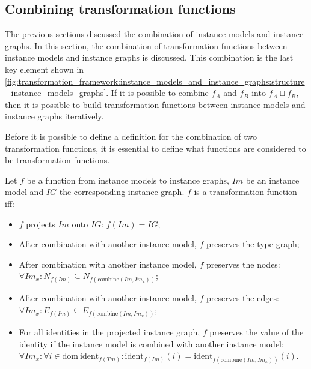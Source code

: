 \subsection{Combining transformation functions}
\label{subsec:transformation_framework:instance_models_and_instance_graphs:combining_transformation_functions}

The previous sections discussed the combination of instance models and instance graphs. In this section, the combination of transformation functions between instance models and instance graphs is discussed. This combination is the last key element shown in \cref{fig:transformation_framework:instance_models_and_instance_graphs:structure_instance_models_graphs}. If it is possible to combine $f_A$ and $f_B$ into $f_{A} \sqcup f_{B}$, then it is possible to build transformation functions between instance models and instance graphs iteratively.

Before it is possible to define a definition for the combination of two transformation functions, it is essential to define what functions are considered to be transformation functions.

\begin{defin}
\label{defin:transformation_framework:instance_models_and_instance_graphs:combining_transformation_functions:transformation_function_instance_model_instance_graph}
Let $f$ be a function from instance models to instance graphs, $Im$ be an instance model and $IG$ the corresponding instance graph. $f$ is a transformation function iff:
\begin{itemize}
    \item $f$ projects $Im$ onto $IG$: $f(Im) = IG$;
    \item After combination with another instance model, $f$ preserves the type graph;
    \item After combination with another instance model, $f$ preserves the nodes:\\$\forall Im_x\!: N_{f(Im)} \subseteq N_{f(\mathrm{combine}(Im, Im_x))}$;
    \item After combination with another instance model, $f$ preserves the edges:\\$\forall Im_x\!: E_{f(Im)} \subseteq E_{f(\mathrm{combine}(Im, Im_x))}$;
    \item For all identities in the projected instance graph, $f$ preserves the value of the identity if the instance model is combined with another instance model:\\$\forall Im_x\!: \forall i \in \mathrm{dom}\ \mathrm{ident}_{f(Tm)}\!: \mathrm{ident}_{f(Im)}(i) = \mathrm{ident}_{f(\mathrm{combine}(Im, Im_x))}(i)$.
\end{itemize}
\end{defin}

